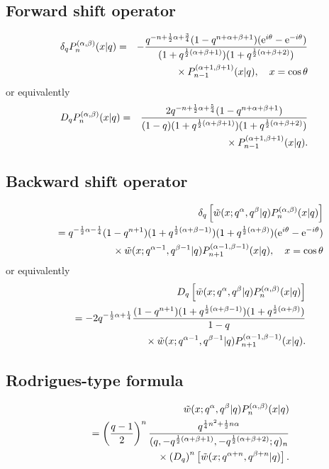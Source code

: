 \documentclass[envcountchap,graybox]{svmono}
\newcommand{\mathindent}{\hspace{7.5mm}}
\newcommand{\e}{\textrm{e}}
\begin{document}
\subsection*{Forward shift operator}
\begin{eqnarray}
\label{shift1ContqJacobiI}
\delta_qP_n^{(\alpha,\beta)}(x|q)&=&-\frac{q^{-n+\frac{1}{2}\alpha+\frac{3}{4}}
(1-q^{n+\alpha+\beta+1})(\e^{i\theta}-\e^{-i\theta})}{(1+q^{\frac{1}{2}(\alpha+\beta+1)})
(1+q^{\frac{1}{2}(\alpha+\beta+2)})}\nonumber\\
& &{}\mathindent{}\times P_{n-1}^{(\alpha+1,\beta+1)}(x|q),\quad x=\cos\theta
\end{eqnarray}
or equivalently
\begin{eqnarray}
\label{shift1ContqJacobiII}
D_qP_n^{(\alpha,\beta)}(x|q)&=&\frac{2q^{-n+\frac{1}{2}\alpha+\frac{5}{4}}
(1-q^{n+\alpha+\beta+1})}{(1-q)(1+q^{\frac{1}{2}(\alpha+\beta+1)})
(1+q^{\frac{1}{2}(\alpha+\beta+2)})}\nonumber\\
& &{}\mathindent{}\times P_{n-1}^{(\alpha+1,\beta+1)}(x|q).
\end{eqnarray}

\subsection*{Backward shift operator}
\begin{eqnarray}
\label{shift2ContqJacobiI}
& &\delta_q\left[{\tilde w}(x;q^{\alpha},q^{\beta}|q)P_n^{(\alpha,\beta)}(x|q)\right]\nonumber\\
& &{}=q^{-\frac{1}{2}\alpha-\frac{1}{4}}(1-q^{n+1})(1+q^{\frac{1}{2}(\alpha+\beta-1)})
(1+q^{\frac{1}{2}(\alpha+\beta)})(\e^{i\theta}-\e^{-i\theta})\nonumber\\
& &{}\mathindent{}\times{\tilde w}(x;q^{\alpha-1},q^{\beta-1}|q)
P_{n+1}^{(\alpha-1,\beta-1)}(x|q),\quad x=\cos\theta
\end{eqnarray}
or equivalently
\begin{eqnarray}
\label{shift2ContqJacobiII}
& &D_q\left[{\tilde w}(x;q^{\alpha},q^{\beta}|q)P_n^{(\alpha,\beta)}(x|q)\right]\nonumber\\
& &{}=-2q^{-\frac{1}{2}\alpha+\frac{1}{4}}
\frac{(1-q^{n+1})(1+q^{\frac{1}{2}(\alpha+\beta-1)})(1+q^{\frac{1}{2}(\alpha+\beta)})}{1-q}\nonumber\\
& &{}\mathindent{}\times{\tilde w}(x;q^{\alpha-1},q^{\beta-1}|q)P_{n+1}^{(\alpha-1,\beta-1)}(x|q).
\end{eqnarray}

\subsection*{Rodrigues-type formula}
\begin{eqnarray}
\label{RodContqJacobi}
& &{\tilde w}(x;q^\alpha,q^\beta|q)P_n^{(\alpha,\beta)}(x|q)\nonumber\\
& &{}=\left(\frac{q-1}{2}\right)^n\frac{q^{\frac{1}{4}n^2+\frac{1}{2}n\alpha}}
{(q,-q^{\frac{1}{2}(\alpha+\beta+1)},-q^{\frac{1}{2}(\alpha+\beta+2)};q)_n}\nonumber\\
& &{}\mathindent{}\times\left(D_q\right)^n\left[{\tilde w}(x;q^{\alpha+n},q^{\beta+n}|q)\right].
\end{eqnarray}
\end{document}
